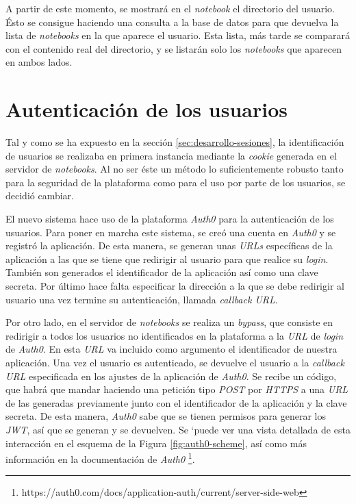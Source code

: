\documentclass[11pt,spanish,listoffigures]{tfgetsinf}
\begin{document}
A partir de este momento, se mostrará en el \textit{notebook} el directorio del usuario. Ésto se consigue haciendo una consulta a la base de datos para que devuelva la lista de \textit{notebooks} en la que aparece el usuario. Esta lista, más tarde se comparará con el contenido real del directorio, y se listarán solo los \textit{notebooks} que aparecen en ambos lados.



\section{Autenticación de los usuarios}
\label{sec:desarrollo-auth}

Tal y como se ha expuesto en la sección \ref{sec:desarrollo-sesiones}, la identificación de usuarios se realizaba en primera instancia mediante la \textit{cookie} generada en el servidor de \textit{notebooks}. Al no ser éste un método lo suficientemente robusto tanto para la seguridad de la plataforma como para el uso por parte de los usuarios, se decidió cambiar.

El nuevo sistema hace uso de la plataforma \textit{Auth0} para la autenticación de los usuarios. Para poner en marcha este sistema, se creó una cuenta en \textit{Auth0} y se registró la aplicación. De esta manera, se generan unas \textit{URLs} específicas de la aplicación a las que se tiene que redirigir al usuario para que realice su \textit{login}. También son generados el identificador de la aplicación así como una clave secreta. Por último hace falta especificar la dirección a la que se debe redirigir al usuario una vez termine su autenticación, llamada \textit{callback URL}. 

Por otro lado, en el servidor de \textit{notebooks} se realiza un \textit{bypass}, que consiste en redirigir a todos los usuarios no identificados en la plataforma a la \textit{URL} de \textit{login} de \textit{Auth0}. En esta \textit{URL} va incluido como argumento el identificador de nuestra aplicación. Una vez el usuario es autenticado, se devuelve el usuario a la \textit{callback URL} especificada en los ajustes de la aplicación de \textit{Auth0}. Se recibe un código, que habrá que mandar haciendo una petición tipo \textit{POST} por \textit{HTTPS} a una \textit{URL} de las generadas previamente junto con el identificador de la aplicación y la clave secreta. De esta manera, \textit{Auth0} sabe que se tienen permisos para generar los \textit{JWT}, así que se generan y se devuelven.
Se `puede ver una vista detallada de esta interacción en el esquema de la Figura \ref{fig:auth0-scheme}, así como más información en la documentación de \textit{Auth0} \footnote{https://auth0.com/docs/application-auth/current/server-side-web}.
\end{document}
